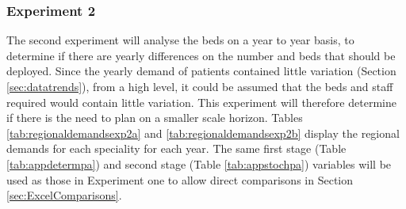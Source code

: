 \documentclass[../thesis.tex]{subfiles}
\begin{document}
\subsubsection{Experiment 2}
The second experiment will analyse the beds on a year to year basis, to determine if there are yearly differences on the number and beds that should be deployed. Since the yearly demand of patients contained little variation (Section \ref{sec:datatrends}), from a high level, it could be assumed that the beds and staff required would contain little variation. This experiment will therefore determine if there is the need to plan on a smaller scale horizon.  %
Tables \ref{tab:regionaldemandsexp2a} and \ref{tab:regionaldemandsexp2b} display the regional demands for each speciality for each year. The same first stage (Table \ref{tab:appdetermpa}) and second stage (Table \ref{tab:appstochpa}) variables will be used as those in Experiment one to allow direct comparisons in Section \ref{sec:ExcelComparisons}.
\end{document}
